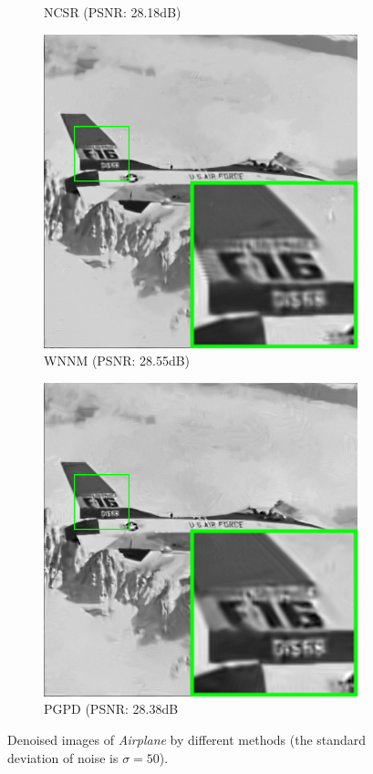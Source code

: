 \begin{figure}
\begin{subfigure}[t]{0.2\textwidth}
		\caption{NCSR (PSNR: 28.18dB)}
    \end{subfigure}
    \hfill
    \begin{subfigure}[t]{0.2\textwidth}
        \centering
        \includegraphics[width=1\textwidth]{images/pgpd/br_WNNM_50_airplane.png}
		\caption{WNNM (PSNR: 28.55dB)}
    \end{subfigure}
    \hfill
    \begin{subfigure}[t]{0.2\textwidth}
        \centering
        \includegraphics[width=1\textwidth]{images/pgpd/br_our_50_airplane.png}
		\caption{PGPD (PSNR: 28.38dB}
    \end{subfigure}
    \caption{Denoised images of \textsl{Airplane} by different methods (the standard deviation of noise is $\sigma=50$).}
    \label{fig6}
\end{figure}
